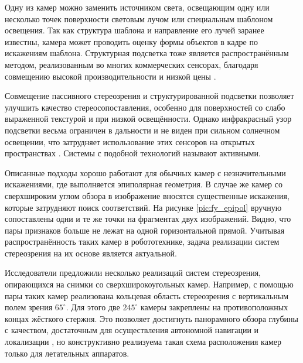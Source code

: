 Одну из камер можно заменить источником  света, освещающим одну или несколько точек поверхности световым лучом или специальным шаблоном освещения.  %
Так как структура шаблона и направление его  лучей заранее известны, камера может проводить оценку формы объектов в кадре по искажениям шаблона\cite{shapiro}. 
Структурная подсветка тоже является распространённым методом, реализованным во многих коммерческих сенсорах,  благодаря совмещению высокой производительности 
и  низкой цены \cite{find:struct_light_perfomance}.  

Совмещение пассивного стереозрения и структурированной подсветки позволяет улучшить качество стереосопоставления, особенно для поверхностей со слабо выраженной текстурой
и при низкой освещённости. Однако инфракрасный узор подсветки весьма ограничен в дальности и не виден при сильном солнечном освещении, что затрудняет использование этих    %
сенсоров на открытых пространствах \cite{find:active_perfomance}. Системы с подобной технологий называют активными. 

Описанные подходы хорошо работают для обычных камер с незначительными искажениями, где выполняется эпиполярная геометрия. 
В случае  же камер со сверхшироким углом обзора в изображение вносятся существенные искажения, которые затрудняют поиск соответствий. На 
рисунке \ref{pic:fy_epipol} вручную сопоставлены одни и те же точки на фрагментах двух изображений. Видно, что пары признаков больше не лежат
на одной горизонтальной прямой.  Учитывая распространённость таких  камер в робототехнике, задача реализации систем стереозрения на их основе 
является актуальной.    %


Исследователи предложили несколько реализаций систем стереозрения, опирающихся на снимки со сверхширокоугольных камер. 
Например, с помощью  пары таких камер реализована  кольцевая область стереозрения с вертикальным  %
полем зрения $65^\circ$\cite{omni_stereo}. Для этого две $245^\circ$ камеры закреплены на противоположных концах жёсткого стержня.  
Это позволяет достигнуть панорамного обзора глубины с качеством, достаточным для осуществления автономной навигации и
локализации \cite{omni_copter}, но конструктивно реализуема такая схема расположения камер только для летательных аппаратов.  

